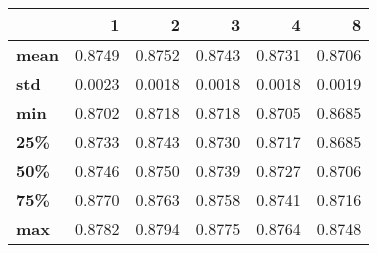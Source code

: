 \begin{tabular}{lrrrrr}
\toprule
{} &       1 &       2 &       3 &       4 &       8 \\
\midrule
\textbf{mean} &  0.8749 &  0.8752 &  0.8743 &  0.8731 &  0.8706 \\
\textbf{std } &  0.0023 &  0.0018 &  0.0018 &  0.0018 &  0.0019 \\
\textbf{min } &  0.8702 &  0.8718 &  0.8718 &  0.8705 &  0.8685 \\
\textbf{25\% } &  0.8733 &  0.8743 &  0.8730 &  0.8717 &  0.8685 \\
\textbf{50\% } &  0.8746 &  0.8750 &  0.8739 &  0.8727 &  0.8706 \\
\textbf{75\% } &  0.8770 &  0.8763 &  0.8758 &  0.8741 &  0.8716 \\
\textbf{max } &  0.8782 &  0.8794 &  0.8775 &  0.8764 &  0.8748 \\
\bottomrule
\end{tabular}
